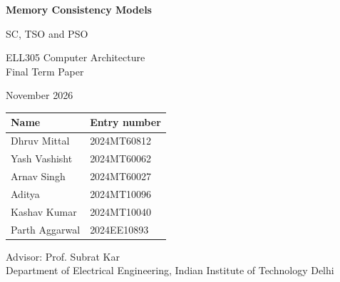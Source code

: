 \newcommand{\fourpanels}[3]{%
\begin{tikzpicture}[scale=0.9, transform shape]
  \begin{scope}[shift={(0,0)}]
    \node[font=\small\bfseries] at (1.9,4.2) {1. program order};
    #1{p}{1}{#2}{#3}
  \end{scope}
  \begin{scope}[shift={(7.0,0)}]
    \node[font=\small\bfseries] at (1.9,4.2) {2. add reads-from};
    #1{q}{2}{#2}{#3}
  \end{scope}
  \begin{scope}[shift={(0,-6.8)}]
    \node[font=\small\bfseries] at (1.9,4.2) {3. add coherence order};
    #1{r}{3}{#2}{#3}
  \end{scope}
  \begin{scope}[shift={(7.0,-6.8)}]
    \node[font=\small\bfseries] at (1.9,4.2) {4. add from-read};
    #1{s}{4}{#2}{#3}
  \end{scope}
\end{tikzpicture}}



\begin{titlepage}
\centering
\vspace*{1.2cm}
{\LARGE\bfseries Memory Consistency Models\par}
\vspace{0.5cm}
{\Large SC, TSO and PSO\par}
\vspace{0.8cm}
{\large ELL305 Computer Architecture\\ Final Term Paper\par}
\vspace{1.6cm}
{\large November 2026\par}
\vspace{1.8cm}
\begin{tabular}{ll}
\toprule
\textbf{Name} & \textbf{Entry number}\\
\midrule
Dhruv Mittal & 2024MT60812\\
Yash Vashisht & 2024MT60062\\
Arnav Singh & 2024MT60027\\
Aditya & 2024MT10096\\
Kashav Kumar & 2024MT10040\\
Parth Aggarwal & 2024EE10893\\
\bottomrule
\end{tabular}
\vfill
{Advisor: Prof. Subrat Kar\\
Department of Electrical Engineering, Indian Institute of Technology Delhi\par}
\vspace{0.6cm}
\end{titlepage}
\setcounter{page}{2}

